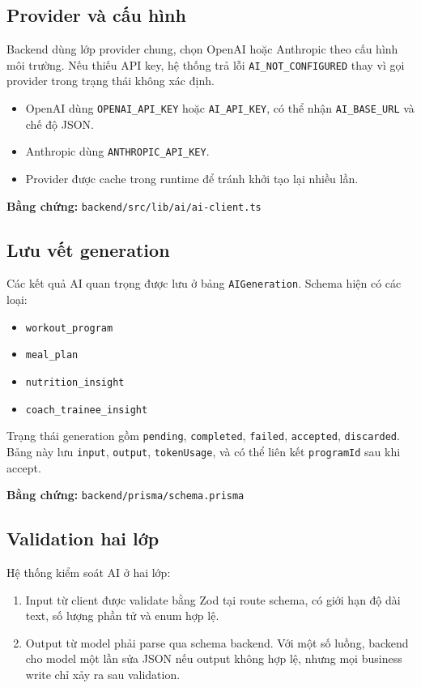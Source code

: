 \documentclass[12pt,a4paper]{article}
\newcommand{\code}[1]{\texttt{#1}}
\newcommand{\evidence}[1]{{\small\nolinkurl{#1}}}
\begin{document}
\subsection{Provider và cấu hình}

Backend dùng lớp provider chung, chọn OpenAI hoặc Anthropic theo cấu hình môi trường. Nếu thiếu API key, hệ thống trả lỗi \code{AI\_NOT\_CONFIGURED} thay vì gọi provider trong trạng thái không xác định.

\begin{itemize}
  \item OpenAI dùng \code{OPENAI\_API\_KEY} hoặc \code{AI\_API\_KEY}, có thể nhận \code{AI\_BASE\_URL} và chế độ JSON.
  \item Anthropic dùng \code{ANTHROPIC\_API\_KEY}.
  \item Provider được cache trong runtime để tránh khởi tạo lại nhiều lần.
\end{itemize}

\textbf{Bằng chứng:} \evidence{backend/src/lib/ai/ai-client.ts}

\subsection{Lưu vết generation}

Các kết quả AI quan trọng được lưu ở bảng \code{AIGeneration}. Schema hiện có các loại:

\begin{itemize}
  \item \code{workout\_program}
  \item \code{meal\_plan}
  \item \code{nutrition\_insight}
  \item \code{coach\_trainee\_insight}
\end{itemize}

Trạng thái generation gồm \code{pending}, \code{completed}, \code{failed}, \code{accepted}, \code{discarded}. Bảng này lưu \code{input}, \code{output}, \code{tokenUsage}, và có thể liên kết \code{programId} sau khi accept.

\textbf{Bằng chứng:} \evidence{backend/prisma/schema.prisma}

\subsection{Validation hai lớp}

Hệ thống kiểm soát AI ở hai lớp:

\begin{enumerate}
  \item Input từ client được validate bằng Zod tại route schema, có giới hạn độ dài text, số lượng phần tử và enum hợp lệ.
  \item Output từ model phải parse qua schema backend. Với một số luồng, backend cho model một lần sửa JSON nếu output không hợp lệ, nhưng mọi business write chỉ xảy ra sau validation.
\end{enumerate}
\end{document}

